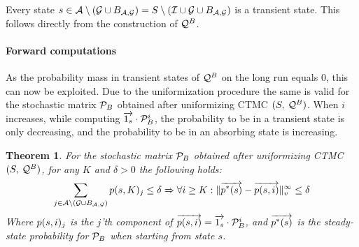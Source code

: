 \documentclass[a4paper,11pt]{article}
\newtheorem{theorem}{Theorem}
\begin{document}
	Every state $s \in \mathcal{A} \setminus \left( \mathcal{G} \cup B_{ \mathcal{A}, \mathcal{G} } \right) = S \setminus (\mathcal{I} \cup \mathcal{G} \cup B_{ \mathcal{A}, \mathcal{G} })$ is a transient state. This follows directly from the construction of $\mathcal{Q}^{B}$. 
	
	\paragraph{Forward computations}	
	As the probability mass in transient states of $\mathcal{Q}^{B}$ on the long run equals 0, this can now be exploited. Due to the uniformization procedure the same is valid for the stochastic matrix $\mathcal{P}_{B}$ obtained after uniformizing CTMC $(S,\:\mathcal{Q}^{B})$. When $i$ increases, while computing $\overrightarrow{1_{s} } \cdot \mathcal{P}_{B}^{i}$, the probability to be in a transient state is only decreasing, and the probability to be in an absorbing state is increasing.
	
	\begin{theorem}
		For the stochastic matrix $\mathcal{P}_{B}$ obtained after uniformizing CTMC $(S,\:\mathcal{Q}^{B})$, for any $K$ and $\delta > 0$ the following holds:
			\[
				\sum_{j \in \mathcal{A} \setminus \left( \mathcal{G} \cup B_{ \mathcal{A}, \mathcal{G} } \right)} p(s,K)_{j} \leq \delta \Rightarrow \forall i \geq K : \lVert  \overrightarrow{p^{*}(s)} - \overrightarrow{p(s,i)}  \rVert_{v}^{\infty} \leq \delta
			 \]
		Where $p(s,i)_{j}$ is the $j$'th component of $\overrightarrow{p(s,i)} = \overrightarrow{1_{s} } \cdot \mathcal{P}_{B}^{i} $, and $\overrightarrow{p^{*}(s)}$ is the steady-state probability for $\mathcal{P}_{B}$ when starting from state $s$. \label{th:criteria_1}
	 \end{theorem}
\end{document}
